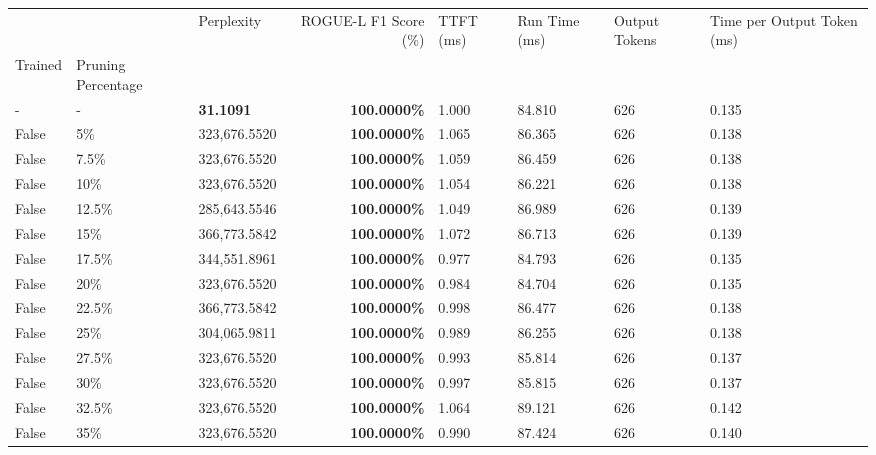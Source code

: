 \begin{table}[H]
\label{tab:evaluation-pipeline-5-untrained}
\begin{tabular}{lllrllll}
\toprule
 &  & Perplexity & ROGUE-L F1 Score (\%) & TTFT (ms) & Run Time (ms) & Output Tokens & Time per Output Token (ms) \\
Trained & Pruning Percentage &  &  &  &  &  &  \\
\midrule
- & - & \bfseries 31.1091 & \bfseries 100.0000\% & 1.000 & 84.810 & 626 & 0.135 \\
\cline{1-8} \cline{2-8}
False & 5\% & 323,676.5520 & \bfseries \color{red} 100.0000\% & 1.065 & 86.365 & 626 & 0.138 \\
\cline{1-8} \cline{2-8}
False & 7.5\% & 323,676.5520 & \bfseries \color{red} 100.0000\% & 1.059 & 86.459 & 626 & 0.138 \\
\cline{1-8} \cline{2-8}
False & 10\% & 323,676.5520 & \bfseries \color{red} 100.0000\% & 1.054 & 86.221 & 626 & 0.138 \\
\cline{1-8} \cline{2-8}
False & 12.5\% & \color{red} 285,643.5546 & \bfseries \color{red} 100.0000\% & 1.049 & 86.989 & 626 & 0.139 \\
\cline{1-8} \cline{2-8}
False & 15\% & 366,773.5842 & \bfseries \color{red} 100.0000\% & 1.072 & 86.713 & 626 & 0.139 \\
\cline{1-8} \cline{2-8}
False & 17.5\% & 344,551.8961 & \bfseries \color{red} 100.0000\% & 0.977 & 84.793 & 626 & 0.135 \\
\cline{1-8} \cline{2-8}
False & 20\% & 323,676.5520 & \bfseries \color{red} 100.0000\% & 0.984 & 84.704 & 626 & 0.135 \\
\cline{1-8} \cline{2-8}
False & 22.5\% & 366,773.5842 & \bfseries \color{red} 100.0000\% & 0.998 & 86.477 & 626 & 0.138 \\
\cline{1-8} \cline{2-8}
False & 25\% & 304,065.9811 & \bfseries \color{red} 100.0000\% & 0.989 & 86.255 & 626 & 0.138 \\
\cline{1-8} \cline{2-8}
False & 27.5\% & 323,676.5520 & \bfseries \color{red} 100.0000\% & 0.993 & 85.814 & 626 & 0.137 \\
\cline{1-8} \cline{2-8}
False & 30\% & 323,676.5520 & \bfseries \color{red} 100.0000\% & 0.997 & 85.815 & 626 & 0.137 \\
\cline{1-8} \cline{2-8}
False & 32.5\% & 323,676.5520 & \bfseries \color{red} 100.0000\% & 1.064 & 89.121 & 626 & 0.142 \\
\cline{1-8} \cline{2-8}
False & 35\% & 323,676.5520 & \bfseries \color{red} 100.0000\% & 0.990 & 87.424 & 626 & 0.140 \\

\end{tabular}
\end{table}
